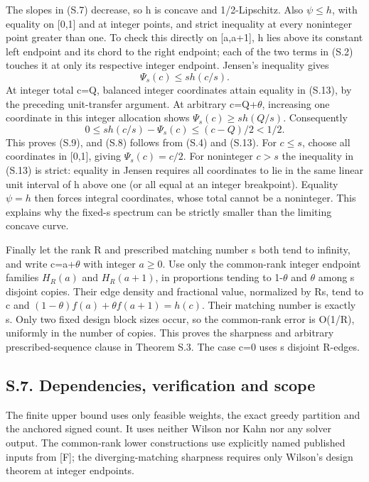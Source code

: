\documentclass[
  11pt,
]{article}
\begin{document}
The slopes in (S.7) decrease, so h is concave and 1/2-Lipschitz. Also
\(\psi\le h\), with equality on {[}0,1{]} and at integer points, and
strict inequality at every noninteger point greater than one. To check
this directly on {[}a,a+1{]}, h lies above its constant left endpoint
and its chord to the right endpoint; each of the two terms in (S.2)
touches it at only its respective integer endpoint. Jensen's inequality
gives \[
                         \Psi_s(c)\le s h(c/s).             \tag{S.13}
\] At integer total c=Q, balanced integer coordinates attain equality in
(S.13), by the preceding unit-transfer argument. At arbitrary
c=Q+\(\theta\), increasing one coordinate in this integer allocation
shows \(\Psi_s(c)\ge s h(Q/s)\). Consequently \[
       0\le s h(c/s)-\Psi_s(c)\le(c-Q)/2<1/2.              \tag{S.14}
\] This proves (S.9), and (S.8) follows from (S.4) and (S.13). For
\(c\le s\), choose all coordinates in {[}0,1{]}, giving
\(\Psi_s(c)=c/2\). For noninteger \(c>s\) the inequality in (S.13) is
strict: equality in Jensen requires all coordinates to lie in the same
linear unit interval of h above one (or all equal at an integer
breakpoint). Equality \(\psi=h\) then forces integral coordinates, whose
total cannot be a noninteger. This explains why the fixed-s spectrum can
be strictly smaller than the limiting concave curve.

Finally let the rank R and prescribed matching number s both tend to
infinity, and write c=a+\(\theta\) with integer \(a\ge0\). Use only the
common-rank integer endpoint families \(H_R(a)\) and \(H_R(a+1)\), in
proportions tending to 1-\(\theta\) and \(\theta\) among s disjoint
copies. Their edge density and fractional value, normalized by Rs, tend
to c and \((1-\theta)f(a)+\theta f(a+1)=h(c)\). Their matching number is
exactly s. Only two fixed design block sizes occur, so the common-rank
error is O(1/R), uniformly in the number of copies. This proves the
sharpness and arbitrary prescribed-sequence clause in Theorem S.3. The
case c=0 uses s disjoint R-edges.

\subsection{S.7. Dependencies, verification and
scope}\label{s.7.-dependencies-verification-and-scope}

The finite upper bound uses only feasible weights, the exact greedy
partition and the anchored signed count. It uses neither Wilson nor Kahn
nor any solver output. The common-rank lower constructions use
explicitly named published inputs from {[}F{]}; the diverging-matching
sharpness requires only Wilson's design theorem at integer endpoints.
\end{document}
